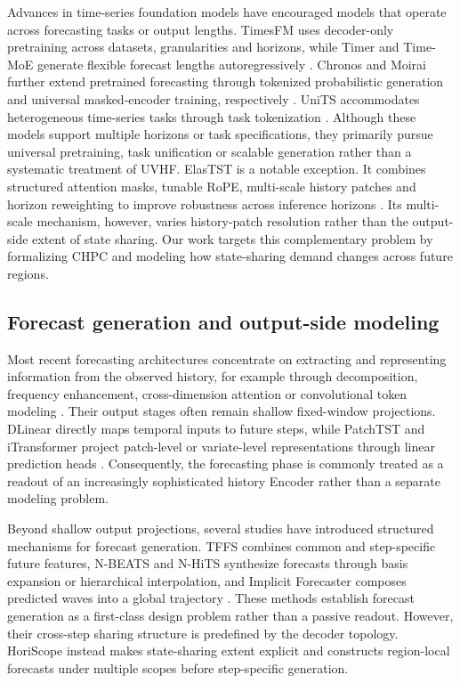 Advances in time-series foundation models have encouraged models that operate across forecasting tasks or output lengths. TimesFM uses decoder-only pretraining across datasets, granularities and horizons, while Timer and Time-MoE generate flexible forecast lengths autoregressively \citep{das2024timesfm,liu2024timer,shi2025timemoe}. Chronos and Moirai further extend pretrained forecasting through tokenized probabilistic generation and universal masked-encoder training, respectively \citep{ansari2024chronos,woo2024moirai}. UniTS accommodates heterogeneous time-series tasks through task tokenization \citep{gao2024units}. Although these models support multiple horizons or task specifications, they primarily pursue universal pretraining, task unification or scalable generation rather than a systematic treatment of UVHF. ElasTST is a notable exception. It combines structured attention masks, tunable RoPE, multi-scale history patches and horizon reweighting to improve robustness across inference horizons \citep{zhang2024elastst}. Its multi-scale mechanism, however, varies history-patch resolution rather than the output-side extent of state sharing. Our work targets this complementary problem by formalizing CHPC and modeling how state-sharing demand changes across future regions.

\subsection{Forecast generation and output-side modeling}


Most recent forecasting architectures concentrate on extracting and representing information from the observed history, for example through decomposition, frequency enhancement, cross-dimension attention or convolutional token modeling \citep{wu2021autoformer,zhou2022fedformer,liu2022nonstationary,zhang2023crossformer,luo2024moderntcn}. Their output stages often remain shallow fixed-window projections. DLinear directly maps temporal inputs to future steps, while PatchTST and iTransformer project patch-level or variate-level representations through linear prediction heads \citep{zeng2023dlinear,nie2023patchtst,liu2024itransformer}. Consequently, the forecasting phase is commonly treated as a readout of an increasingly sophisticated history Encoder rather than a separate modeling problem.

Beyond shallow output projections, several studies have introduced structured mechanisms for forecast generation. TFFS combines common and step-specific future features, N-BEATS and N-HiTS synthesize forecasts through basis expansion or hierarchical interpolation, and Implicit Forecaster composes predicted waves into a global trajectory \citep{zhang2024tffs,oreshkin2020nbeats,challu2023nhits,li2025implicit}. These methods establish forecast generation as a first-class design problem rather than a passive readout. However, their cross-step sharing structure is predefined by the decoder topology. HoriScope instead makes state-sharing extent explicit and constructs region-local forecasts under multiple scopes before step-specific generation.

